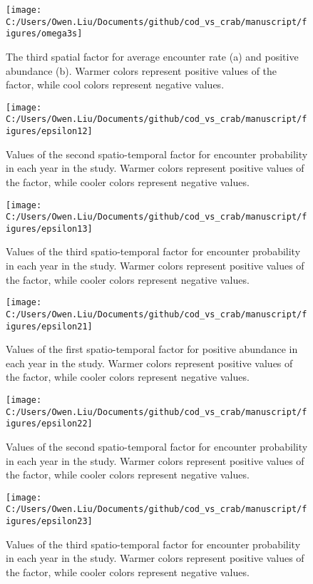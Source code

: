 \documentclass[11pt,]{article}
\begin{document}
\begin{figure}
\texttt{[image: C:/Users/Owen.Liu/Documents/github/cod\_vs\_crab/manuscript/figures/omega3s]} \caption{The third spatial factor for average encounter rate (a) and positive abundance (b). Warmer colors represent positive values of the factor, while cool colors represent negative values.}\label{fig:omega13}
\end{figure}

\begin{figure}
\texttt{[image: C:/Users/Owen.Liu/Documents/github/cod\_vs\_crab/manuscript/figures/epsilon12]} \caption{Values of the second spatio-temporal factor for encounter probability in each year in the study. Warmer colors represent positive values of the factor, while cooler colors represent negative values.}\label{fig:epsilon12}
\end{figure}

\begin{figure}
\texttt{[image: C:/Users/Owen.Liu/Documents/github/cod\_vs\_crab/manuscript/figures/epsilon13]} \caption{Values of the third spatio-temporal factor for encounter probability in each year in the study. Warmer colors represent positive values of the factor, while cooler colors represent negative values.}\label{fig:epsilon13}
\end{figure}

\begin{figure}
\texttt{[image: C:/Users/Owen.Liu/Documents/github/cod\_vs\_crab/manuscript/figures/epsilon21]} \caption{Values of the first spatio-temporal factor for positive abundance in each year in the study. Warmer colors represent positive values of the factor, while cooler colors represent negative values.}\label{fig:epsilon21}
\end{figure}

\begin{figure}
\texttt{[image: C:/Users/Owen.Liu/Documents/github/cod\_vs\_crab/manuscript/figures/epsilon22]} \caption{Values of the second spatio-temporal factor for encounter probability in each year in the study. Warmer colors represent positive values of the factor, while cooler colors represent negative values.}\label{fig:epsilon22}
\end{figure}

\begin{figure}
\texttt{[image: C:/Users/Owen.Liu/Documents/github/cod\_vs\_crab/manuscript/figures/epsilon23]} \caption{Values of the third spatio-temporal factor for encounter probability in each year in the study. Warmer colors represent positive values of the factor, while cooler colors represent negative values.}\label{fig:epsilon23}
\end{figure}
\end{document}
